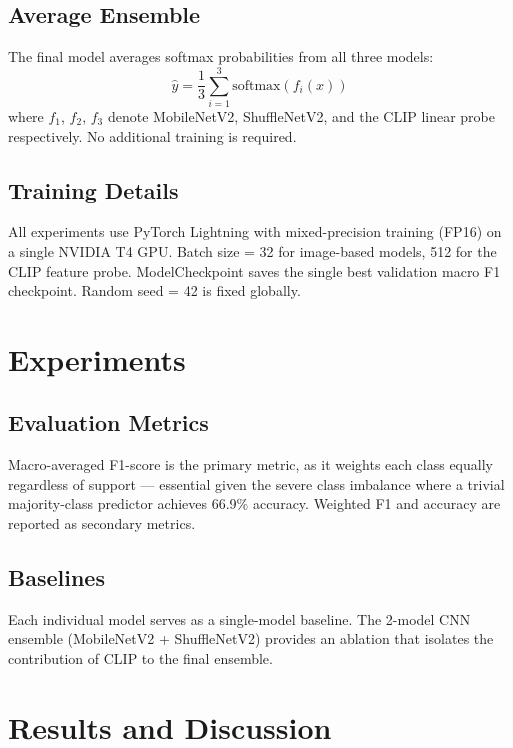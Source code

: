 \documentclass[conference]{IEEEtran}
\begin{document}
\subsection{Average Ensemble}
The final model averages softmax probabilities from all three models:
\begin{equation}
    \hat{y} = \frac{1}{3}\sum_{i=1}^{3} \text{softmax}(f_i(x))
    \label{eq:ensemble}
\end{equation}
where $f_1$, $f_2$, $f_3$ denote MobileNetV2, ShuffleNetV2, and the
CLIP linear probe respectively. No additional training is required.

\subsection{Training Details}
All experiments use PyTorch Lightning with mixed-precision training
(FP16) on a single NVIDIA T4 GPU. Batch size = 32 for image-based
models, 512 for the CLIP feature probe. ModelCheckpoint saves the
single best validation macro F1 checkpoint. Random seed = 42 is fixed
globally.

\section{Experiments}

\subsection{Evaluation Metrics}
Macro-averaged F1-score is the primary metric, as it weights each
class equally regardless of support --- essential given the severe
class imbalance where a trivial majority-class predictor achieves
66.9\% accuracy. Weighted F1 and accuracy are reported as secondary
metrics.

\subsection{Baselines}
Each individual model serves as a single-model baseline. The 2-model
CNN ensemble (MobileNetV2 + ShuffleNetV2) provides an ablation that
isolates the contribution of CLIP to the final ensemble.

\section{Results and Discussion}
\label{sec:results}
\end{document}
